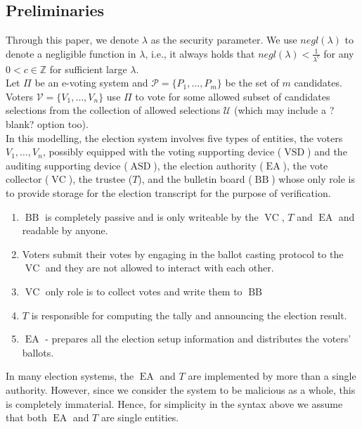 \documentclass[12pt]{article}
\DeclareMathOperator{\vsd}{VSD}
\DeclareMathOperator{\asd}{ASD}
\DeclareMathOperator{\ea}{EA}
\DeclareMathOperator{\bb}{BB}
\DeclareMathOperator{\voc}{VC}
\begin{document}
\subsection{Preliminaries}
Through this paper, we denote $\lambda$ as the security parameter. We use $negl(\lambda)$ to denote a negligible function in $\lambda$, i.e., it always holds that $negl(\lambda) < \frac{1}{\lambda^c}$ for any $0<c \in \mathbb{Z}$ for sufficient large $\lambda$. \\

Let $\Pi$ be an e-voting system and $\mathcal{P} = \{P_1,\dots,P_m\}$ be the set of $m$ candidates. Voters $\mathcal{V} = \{V_1,\dots,V_n\}$ use $\Pi$ to vote for some allowed subset of candidates selections from the collection of allowed selections $\mathcal{U}$ (which may include a ?blank? option too). \\
 
 In this modelling, the election system involves five types of entities, the voters $V_1, \dots , V_n$, possibly equipped with the voting supporting device ($\vsd$) and the auditing supporting device ($\asd$), the election authority ($\ea$), the vote collector ($\voc$), the trustee ($T$), and the bulletin board ($\bb$) whose only role is to provide storage for the election transcript for the purpose of verification. 
\begin{enumerate}
\item $\bb$ is completely passive and is only writeable by the $\voc$, $T$ and $\ea$ and readable by anyone. 
\item Voters submit their votes by engaging in the ballot casting protocol to the $\voc$ and they are not allowed to interact with each other. 
\item $\voc$ only role is to collect votes and write them to $\bb$
\item $T$ is responsible for computing the tally and announcing the election result.
\item $\ea$ - prepares all the election setup information and distributes the voters' ballots.
\end{enumerate}

In many election systems, the $\ea$ and $T$ are implemented by more than a single authority.  However, since we consider the system to be malicious as a whole, this is completely immaterial. Hence, for simplicity in the syntax above we assume that both $\ea$ and $T$ are single entities. 
\end{document}
